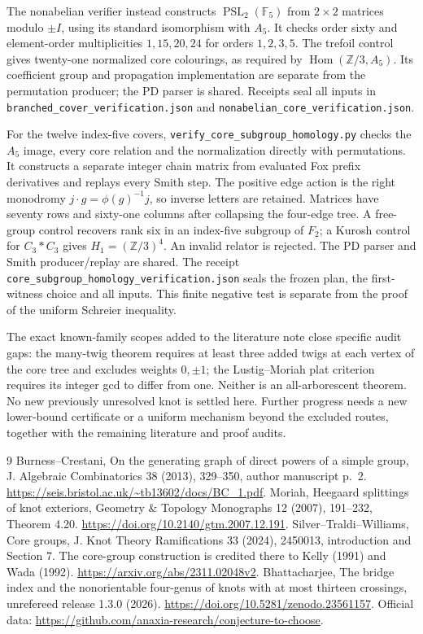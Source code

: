 \documentclass[11pt]{article}
\newcommand{\Hom}{\operatorname{Hom}}
\newcommand{\Z}{\mathbb Z}
\newcommand{\F}{\mathbb F}
\begin{document}
The nonabelian verifier instead constructs
$\operatorname{PSL}_2(\F_5)$ from $2\times2$ matrices modulo $\pm I$,
using its standard isomorphism with $A_5$. It checks order sixty and
element-order multiplicities $1,15,20,24$ for orders $1,2,3,5$.
The trefoil control gives twenty-one normalized core colourings,
as required by $\Hom(\Z/3,A_5)$. Its coefficient group and propagation
implementation are separate from the permutation producer; the PD
parser is shared. Receipts seal all inputs in
\texttt{branched\_cover\_verification.json} and
\texttt{nonabelian\_core\_verification.json}.

For the twelve index-five covers,
\texttt{verify\_core\_subgroup\_homology.py} checks the $A_5$ image,
every core relation and the normalization directly with permutations.
It constructs a separate integer chain matrix from evaluated Fox
prefix derivatives and replays every Smith step. The positive edge
action is the right monodromy $j\cdot g=\phi(g)^{-1}j$, so inverse
letters are retained. Matrices have seventy rows and sixty-one
columns after collapsing the four-edge tree. A free-group control
recovers rank six in an index-five subgroup of $F_2$; a Kurosh control
for $C_3*C_3$ gives $H_1=(\Z/3)^4$. An invalid relator is rejected.
The PD parser and Smith producer/replay are shared. The receipt
\texttt{core\_subgroup\_homology\_verification.json} seals the frozen
plan, the first-witness choice and all inputs. This finite negative
test is separate from the proof of the uniform Schreier inequality.

The exact known-family scopes added to the literature note close
specific audit gaps: the many-twig theorem requires at least three
added twigs at each vertex of the core tree and excludes weights
$0,\pm1$; the Lustig--Moriah plat criterion requires its integer gcd
to differ from one. Neither is an all-arborescent theorem. No new
previously unresolved knot is settled here. Further progress needs
a new lower-bound certificate or a uniform mechanism beyond the
excluded routes, together with the remaining literature and proof
audits.

\begin{thebibliography}{9}
\small
\setlength{\itemsep}{2pt}
 Burness--Crestani, On the generating graph of direct
powers of a simple group, J. Algebraic Combinatorics 38 (2013),
329--350, author manuscript p.~2.
\url{https://seis.bristol.ac.uk/~tb13602/docs/BC_1.pdf}.
 Moriah, Heegaard splittings of knot exteriors,
Geometry \& Topology Monographs 12 (2007), 191--232, Theorem 4.20.
\url{https://doi.org/10.2140/gtm.2007.12.191}.
 Silver--Traldi--Williams, Core groups, J. Knot Theory
Ramifications 33 (2024), 2450013, introduction and Section 7.
The core-group construction is credited there to Kelly (1991) and
Wada (1992). \url{https://arxiv.org/abs/2311.02048v2}.
 Bhattacharjee, The bridge index and the nonorientable
four-genus of knots with at most thirteen crossings, unrefereed release
1.3.0 (2026). \url{https://doi.org/10.5281/zenodo.23561157}.
Official data: \url{https://github.com/anaxia-research/conjecture-to-choose}.
\end{thebibliography}
\end{document}
